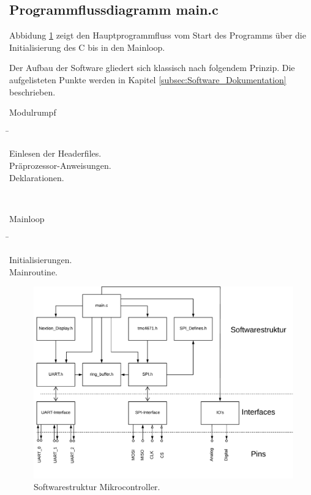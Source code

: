 \subsection{Programmflussdiagramm main.c}

Abbidung \ref{fig:Software_Programmflussdiagramm} zeigt den Hauptprogrammfluss vom Start des Programms über die Initialisierung des \textmu C bis in den Mainloop.

Der Aufbau der Software gliedert sich klassisch nach folgendem Prinzip. Die aufgelisteten Punkte werden in Kapitel \ref{subsec:Software_Dokumentation} beschrieben.

\begin{tabbing}

\parbox[t]{.3\textwidth}{

Modulrumpf

} \=\parbox[t]{.7\textwidth}{

Einlesen der Headerfiles.\\
Präprozessor-Anweisungen.\\
Deklarationen.\\

}\\

\parbox[t]{.3\textwidth}{Mainloop} \=\parbox[t]{.7\textwidth}{

Initialisierungen.\\
Mainroutine.

}
\end{tabbing}

\begin{figure}[h!]
	\centering	
	\includegraphics[width=\textwidth]{graphics/Softwarestruktur.pdf}
	\caption{Softwarestruktur Mikrocontroller.} 
	\label{fig:Software_Programmflussdiagramm}
\end{figure}

